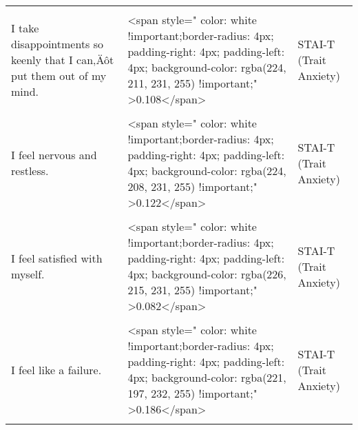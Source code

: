 \documentclass[border=1mm]{standalone}
\begin{document}
\begin{longtable}{lll}
\cellcolor{gray!10}{Some unimportant thought runs through my mind and bothers me.} & \cellcolor{gray!10}{<span style="     color: white !important;border-radius: 4px; padding-right: 4px; padding-left: 4px; background-color: rgba(225, 211, 231, 255) !important;" >0.103</span>} & \cellcolor{gray!10}{STAI-T (Trait Anxiety)}\\
I take disappointments so keenly that I can‚Äôt put them out of my mind. & <span style="     color: white !important;border-radius: 4px; padding-right: 4px; padding-left: 4px; background-color: rgba(224, 211, 231, 255) !important;" >0.108</span> & STAI-T (Trait Anxiety)\\
\cellcolor{gray!10}{I am a steady person.} & \cellcolor{gray!10}{<span style="     color: white !important;border-radius: 4px; padding-right: 4px; padding-left: 4px; background-color: rgba(224, 208, 231, 255) !important;" >0.122</span>} & \cellcolor{gray!10}{STAI-T (Trait Anxiety)}\\
\addlinespace
I feel nervous and restless. & <span style="     color: white !important;border-radius: 4px; padding-right: 4px; padding-left: 4px; background-color: rgba(224, 208, 231, 255) !important;" >0.122</span> & STAI-T (Trait Anxiety)\\
\cellcolor{gray!10}{I get in a state of tension or turmoil as I think over my recent concerns and interests.} & \cellcolor{gray!10}{<span style="     color: white !important;border-radius: 4px; padding-right: 4px; padding-left: 4px; background-color: rgba(228, 226, 229, 255) !important;" >-0.017</span>} & \cellcolor{gray!10}{STAI-T (Trait Anxiety)}\\
I feel satisfied with myself. & <span style="     color: white !important;border-radius: 4px; padding-right: 4px; padding-left: 4px; background-color: rgba(226, 215, 231, 255) !important;" >0.082</span> & STAI-T (Trait Anxiety)\\
\cellcolor{gray!10}{I wish I could be as happy as others seem to be.} & \cellcolor{gray!10}{<span style="     color: white !important;border-radius: 4px; padding-right: 4px; padding-left: 4px; background-color: rgba(224, 209, 231, 255) !important;" >0.118</span>} & \cellcolor{gray!10}{STAI-T (Trait Anxiety)}\\
I feel like a failure. & <span style="     color: white !important;border-radius: 4px; padding-right: 4px; padding-left: 4px; background-color: rgba(221, 197, 232, 255) !important;" >0.186</span> & STAI-T (Trait Anxiety)\\
\addlinespace
\cellcolor{gray!10}{I feel rested.} & \cellcolor{gray!10}{<span style="     color: white !important;border-radius: 4px; padding-right: 4px; padding-left: 4px; background-color: rgba(220, 196, 232, 255) !important;" >0.195</span>} & \cellcolor{gray!10}{STAI-T (Trait Anxiety)}\\

\end{longtable}
\end{document}
